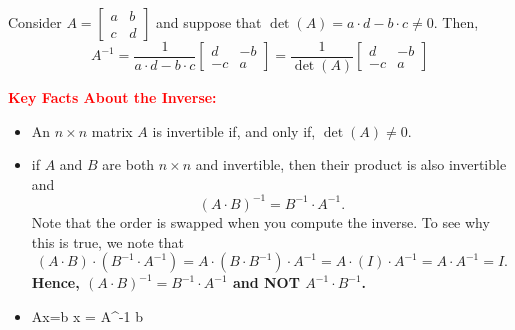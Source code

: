 \documentclass[letterpaper]{book}
\begin{document}
\begin{tcolorbox}[sharp corners, colback=green!30, colframe=green!80!blue, title=\textbf{\large Most Important Matrix Inverse for ROB 101}]
 {\large Consider $A=\left[\begin{array}{rr} a & b \\ c & d\end{array} \right]$ and suppose that $\det(A) = a\cdot d - b \cdot c \neq 0.$ Then,
  $$ A^{-1}= \frac{1}{a\cdot d - b \cdot c} \left[\begin{array}{rr} d & -b \\ -c & a\end{array} \right] = \frac{1}{\det(A)} \left[\begin{array}{rr} d & -b \\ -c & a\end{array} \right] $$}
\end{tcolorbox}
\vspace*{1cm}

\textcolor{red}{\bf \large Key Facts About the Inverse:}
\begin{itemize}
    \item An $n \times n$ matrix $A$ is invertible if, and only if, $\det(A)\neq 0.$
    \item if $A$ and $B$ are both $n\times n$ and invertible, then their product is also invertible and
$$ \boxed{(A \cdot B)^{-1}=B^{-1} \cdot A^{-1}.} $$
Note that the order is swapped when you compute the inverse. To see why this is true, we note that
$$ (A\cdot B) \cdot (B^{-1} \cdot A^{-1}) =   A\cdot (B \cdot B^{-1})  \cdot A^{-1} = A\cdot (I)  \cdot A^{-1} = A\cdot A^{-1} = I.$$
\textbf{Hence, $(A\cdot B)^{-1} = B^{-1} \cdot A^{-1}$ and NOT $ A^{-1} \cdot B^{-1}$.}

\item Ax=b \iff x = A^{-1} \cdot b


\end{itemize}


\vspace*{1cm}
\end{document}
